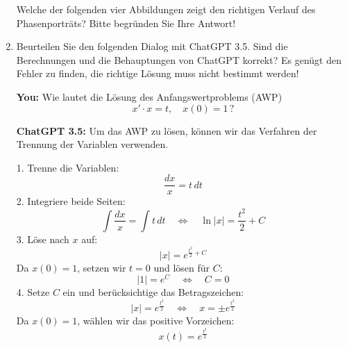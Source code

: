 \begin{Aufgabe}[8]
\begin{enumerate}
			\par
			
			\quad  \quad \quad \quad 
			
			\par
			
			Welche der folgenden vier Abbildungen zeigt den richtigen Verlauf des Phasenporträts?
			Bitte begründen Sie Ihre Antwort!

			\par

			\quad  \hspace*{40mm} 
			
			\par

			\quad  \hspace*{40mm} 

		
	\newpage
	
		\item
			Beurteilen Sie den folgenden Dialog mit ChatGPT 3.5.
			Sind die Berechnungen und die Behauptungen von ChatGPT korrekt?
			Es genügt den Fehler zu finden, die richtige Lösung muss nicht bestimmt werden!
		
			\textbf{You:} Wie lautet die Lösung des Anfangswertproblems (AWP)
			\[
				x' \cdot x = t, \quad x(0) = 1 \, ?
			\]
		
			\textbf{ChatGPT 3.5:} Um das AWP zu lösen, können wir das Verfahren der Trennung der Variablen verwenden.
		
			1. Trenne die Variablen:
			\[ \frac{{dx}}{{x}} = t \, dt \]
			2. Integriere beide Seiten:
			\[ \int \frac{{dx}}{{x}} = \int t \, dt \quad \Longleftrightarrow \quad \ln|x| = \frac{{t^2}}{2} + C \]
			3. Löse nach \(x\) auf:
			\[ |x| = e^{\frac{{t^2}}{2} + C} \]
			Da \(x(0) = 1\), setzen wir \(t = 0\) und lösen für \(C\):
			\[ |1| = e^C \quad \Longleftrightarrow \quad C = 0 \]
			4. Setze \(C\) ein und berücksichtige das Betragszeichen:
			\[ |x| = e^{\frac{{t^2}}{2}} \quad \Longleftrightarrow \quad  x = \pm e^{\frac{{t^2}}{2}} \]
			Da \(x(0) = 1\), wählen wir das positive Vorzeichen:
			\[ x(t) = e^{\frac{{t^2}}{2}} \]
			
\end{enumerate}
\end{Aufgabe}

\newpage

\endinput